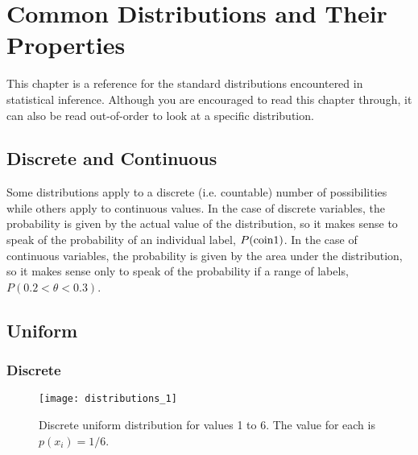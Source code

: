 \chapter{Common Distributions and Their Properties}\label{ch:distributions}

This chapter is a reference for the standard distributions encountered in statistical inference.  Although you are encouraged to read this chapter through, it can also be read out-of-order to look at a specific distribution.

\section{Discrete and Continuous}

Some distributions apply to a discrete (i.e. countable) number of possibilities while others apply to continuous values.  In the case of discrete variables, the probability is given by the actual value of the distribution, so it makes sense to speak of the probability of an individual label, $P({\rm coin 1})$.  In the case of continuous variables, the probability is given by the area under the distribution, so it makes sense only to speak of the probability if a range of labels, $P(0.2 < \theta < 0.3)$. 

\section{Uniform}

\subsection{Discrete}


\begin{figure}
\texttt{[image: distributions\_1]}
\label{fig:uniform_discrete}
\caption{Discrete uniform distribution for values 1 to 6.  The value for each is $p(x_{i})=1/6$.}
\end{figure}

